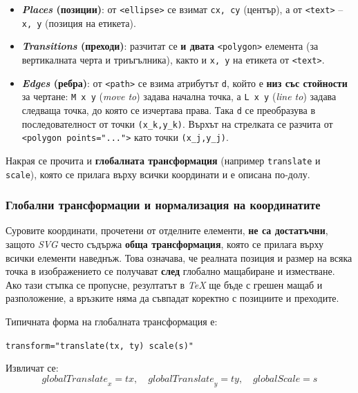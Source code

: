 \begin{itemize}
  \item \textbf{\textit{Places} (позиции)}: от \texttt{<ellipse>} се взимат \texttt{cx, cy} (център), а от \texttt{<text>} -- \texttt{x, y} (позиция на етикета).

  \item \textbf{\textit{Transitions} (преходи)}: разчитат се \textbf{и двата} \texttt{<polygon>} елемента (за вертикалната черта и триъгълника), както и \texttt{x, y} на етикета от \texttt{<text>}.

  \item \textbf{\textit{Edges} (ребра)}: от \texttt{<path>} се взима атрибутът \texttt{d}, който е \textbf{низ със стойности} за чертане: \texttt{M x y} (\textit{move to}) задава начална точка, а \texttt{L x y} (\textit{line to}) задава следваща точка, до която се изчертава права. Така \texttt{d} се преобразува в последователност от точки \texttt{(x\_k,y\_k)}. Върхът на стрелката се разчита от \texttt{<polygon points="..."{}>} като точки \texttt{(x\_j,y\_j)}.
\end{itemize}

Накрая се прочита и \textbf{глобалната трансформация} (например \texttt{translate} и \texttt{scale}), която се прилага върху всички координати и е описана по-долу.
\subsubsection{Глобални трансформации и нормализация на координатите}
\hspace*{2.5em}Суровите координати, прочетени от отделните елементи, \textbf{не са достатъчни}, защото \textit{SVG} често съдържа \textbf{обща трансформация}, която се прилага върху всички елементи наведнъж. Това означава, че реалната позиция и размер на всяка точка в изображението се получават \textbf{след} глобално мащабиране и изместване. Ако тази стъпка се пропусне, резултатът в \textit{TeX} ще бъде с грешен мащаб и разположение, а връзките няма да съвпадат коректно с позициите и преходите.

Типичната форма на глобалната трансформация е:

\begin{center}
	\texttt{transform="translate(tx, ty) scale(s)"}
\end{center}

Извличат се:
\[
\mathit{globalTranslate}_x = tx, \quad
\mathit{globalTranslate}_y = ty, \quad
\mathit{globalScale} = s
\]


